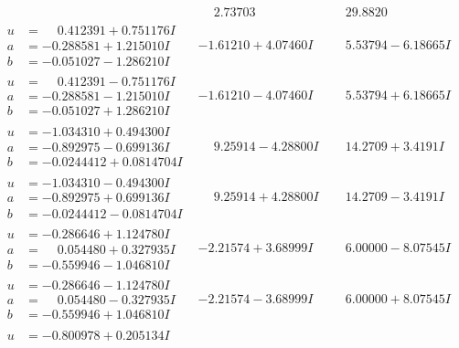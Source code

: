 \documentclass[1p]{elsarticle_modified}
\theoremstyle{definition}
\begin{document}
$$\begin{array}{c|c|c}
 & \phantom{-}2.73703\phantom{ +0.000000I} & \phantom{-}29.8820\phantom{ +0.000000I} \\ \hline\begin{aligned}
u &= \phantom{-}0.412391 + 0.751176 I \\
a &= -0.288581 + 1.215010 I \\
b &= -0.051027 - 1.286210 I\end{aligned}
 & -1.61210 + 4.07460 I & \phantom{-}5.53794 - 6.18665 I \\ \hline\begin{aligned}
u &= \phantom{-}0.412391 - 0.751176 I \\
a &= -0.288581 - 1.215010 I \\
b &= -0.051027 + 1.286210 I\end{aligned}
 & -1.61210 - 4.07460 I & \phantom{-}5.53794 + 6.18665 I \\ \hline\begin{aligned}
u &= -1.034310 + 0.494300 I \\
a &= -0.892975 - 0.699136 I \\
b &= -0.0244412 + 0.0814704 I\end{aligned}
 & \phantom{-}9.25914 - 4.28800 I & \phantom{-}14.2709 + 3.4191 I \\ \hline\begin{aligned}
u &= -1.034310 - 0.494300 I \\
a &= -0.892975 + 0.699136 I \\
b &= -0.0244412 - 0.0814704 I\end{aligned}
 & \phantom{-}9.25914 + 4.28800 I & \phantom{-}14.2709 - 3.4191 I \\ \hline\begin{aligned}
u &= -0.286646 + 1.124780 I \\
a &= \phantom{-}0.054480 + 0.327935 I \\
b &= -0.559946 - 1.046810 I\end{aligned}
 & -2.21574 + 3.68999 I & \phantom{-}6.00000 - 8.07545 I \\ \hline\begin{aligned}
u &= -0.286646 - 1.124780 I \\
a &= \phantom{-}0.054480 - 0.327935 I \\
b &= -0.559946 + 1.046810 I\end{aligned}
 & -2.21574 - 3.68999 I & \phantom{-}6.00000 + 8.07545 I \\ \hline\begin{aligned}
u &= -0.800978 + 0.205134 I \\

\end{aligned}
\end{array}$$
\end{document}
